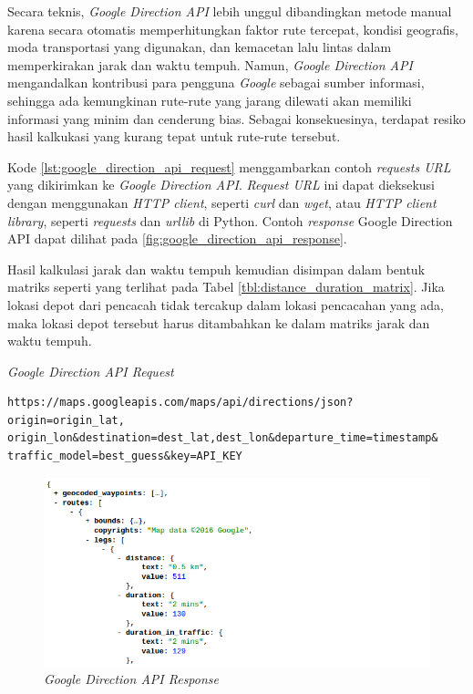 Secara teknis, \textit{Google Direction API} lebih unggul dibandingkan metode manual karena secara otomatis memperhitungkan faktor rute tercepat, kondisi geografis, moda transportasi yang digunakan, dan kemacetan lalu lintas dalam memperkirakan jarak dan waktu tempuh. Namun, \textit{Google Direction API} mengandalkan kontribusi para pengguna \textit{Google} sebagai sumber informasi, sehingga ada kemungkinan rute-rute yang jarang dilewati akan memiliki informasi yang minim dan cenderung bias. Sebagai konsekuesinya, terdapat resiko hasil kalkukasi yang kurang tepat untuk rute-rute tersebut. 


Kode \ref{lst:google_direction_api_request} menggambarkan contoh \textit{requests URL} yang dikirimkan ke \textit{Google Direction API}. \textit{Request URL} ini dapat dieksekusi dengan menggunakan \textit{HTTP client}, seperti \textit{curl} dan \textit{wget}, atau \textit{HTTP client library}, seperti \textit{requests} dan \textit{urllib} di Python. Contoh \textit{response} Google Direction API dapat dilihat pada \autoref{fig:google_direction_api_response}.


Hasil kalkulasi jarak dan waktu tempuh kemudian disimpan dalam bentuk matriks seperti yang terlihat pada Tabel \ref{tbl:distance_duration_matrix}. Jika lokasi depot dari pencacah tidak tercakup dalam lokasi pencacahan yang ada, maka lokasi depot tersebut harus ditambahkan ke dalam matriks jarak dan waktu tempuh.


\begin{listing}[!]
	\captionsetup{format=hang}
	\caption{\textit{Google Direction API Request}}
	\label{lst:google_direction_api_request}
	\begin{verbatim}
https://maps.googleapis.com/maps/api/directions/json?origin=origin_lat,
origin_lon&destination=dest_lat,dest_lon&departure_time=timestamp&
traffic_model=best_guess&key=API_KEY
	\end{verbatim}
\end{listing}


\begin{figure}[!]
	\centering
	\includegraphics[width=\textwidth]{Resources/Images/google_direction_api_response}
	\captionsetup{format=hang}
	\caption{\textit{Google Direction API Response}}
	\label{fig:google_direction_api_response}
\end{figure}


